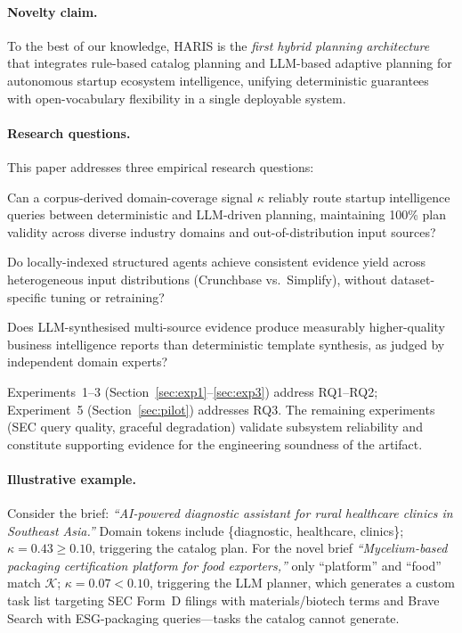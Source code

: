 \documentclass[preprint,12pt]{elsarticle}
\newcommand{\calK}{\mathcal{K}}
\begin{document}
\paragraph{Novelty claim.}
To the best of our knowledge, HARIS is the \emph{first hybrid planning
architecture} that integrates rule-based catalog planning and LLM-based adaptive
planning for autonomous startup ecosystem intelligence, unifying deterministic
guarantees with open-vocabulary flexibility in a single deployable system.

\paragraph{Research questions.}
This paper addresses three empirical research questions:
\begin{description}[leftmargin=2em]
  \item[\textbf{RQ1}] Can a corpus-derived domain-coverage signal $\kappa$
    reliably route startup intelligence queries between deterministic and
    LLM-driven planning, maintaining 100\% plan validity across diverse industry
    domains and out-of-distribution input sources?
  \item[\textbf{RQ2}] Do locally-indexed structured agents achieve consistent
    evidence yield across heterogeneous input distributions (Crunchbase vs.\
    Simplify), without dataset-specific tuning or retraining?
  \item[\textbf{RQ3}] Does LLM-synthesised multi-source evidence produce
    measurably higher-quality business intelligence reports than deterministic
    template synthesis, as judged by independent domain experts?
\end{description}
Experiments~1--3 (Section~\ref{sec:exp1}--\ref{sec:exp3}) address RQ1--RQ2;
Experiment~5 (Section~\ref{sec:pilot}) addresses RQ3. The remaining experiments
(SEC query quality, graceful degradation) validate subsystem reliability and
constitute supporting evidence for the engineering soundness of the artifact.

\paragraph{Illustrative example.}
Consider the brief: \emph{``AI-powered diagnostic assistant for rural healthcare
clinics in Southeast Asia.''} Domain tokens include \{diagnostic, healthcare,
clinics\}; $\kappa = 0.43 \ge 0.10$, triggering the catalog plan. For the novel
brief \emph{``Mycelium-based packaging certification platform for food
exporters,''} only ``platform'' and ``food'' match $\calK$; $\kappa = 0.07 <
0.10$, triggering the LLM planner, which generates a custom task list targeting
SEC Form~D filings with materials/biotech terms and Brave Search with
ESG-packaging queries---tasks the catalog cannot generate.
\end{document}
